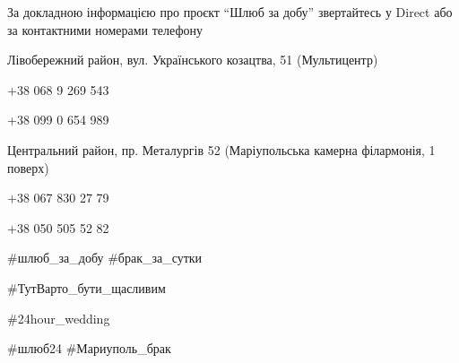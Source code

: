 За докладною інформацією про проєкт \enquote{Шлюб за добу} звертайтесь у Direct
або за контактними номерами телефону 

Лівобережний район, вул. Українського козацтва, 51 (Мультицентр)

+38 068 9 269 543\par
+38 099 0 654 989\par
Центральний район, пр. Металургів 52 (Маріупольська камерна філармонія, 1 поверх)\par
+38 067 830 27 79 \par
+38 050 505 52 82\par

\#шлюб\_за\_добу \#брак\_за\_сутки

\#ТутВарто\_бути\_щасливим 

\#24hour\_wedding 

\#шлюб24 \#Мариуполь\_брак
